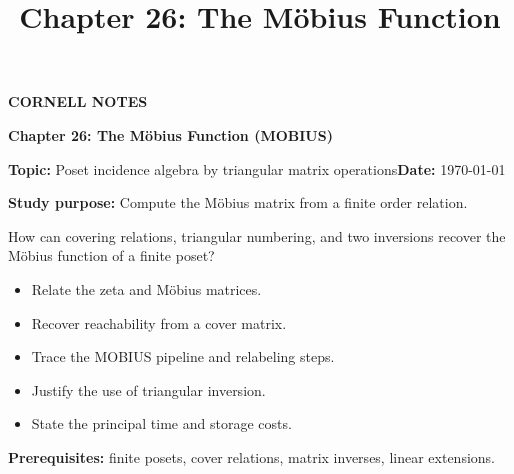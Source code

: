 \documentclass[10pt,letterpaper]{article}
\title{Chapter 26: The M\"obius Function}
\author{}
\date{}
\begin{document}
\maketitle
\begin{tcolorbox}[colback=Paper,colframe=Ink]{\small\bfseries\color{Teal}CORNELL NOTES}\par{\LARGE\bfseries Chapter 26: The M\"obius Function (MOBIUS)}\par\medskip\textbf{Topic:} Poset incidence algebra by triangular matrix operations\hfill\textbf{Date:} \today\par\textbf{Study purpose:} Compute the M\"obius matrix from a finite order relation.
\end{tcolorbox}
\begin{tcolorbox}[colback=Teal!5,colframe=Teal,title=Essential question]How can covering relations, triangular numbering, and two inversions recover the M\"obius function of a finite poset?\end{tcolorbox}
\begin{tcolorbox}[colback=white,colframe=Mist,title=Learning objectives]\begin{itemize}\item Relate the zeta and M\"obius matrices.\item Recover reachability from a cover matrix.\item Trace the MOBIUS pipeline and relabeling steps.\item Justify the use of triangular inversion.\item State the principal time and storage costs.\end{itemize}\textbf{Prerequisites:} finite posets, cover relations, matrix inverses, linear extensions.\end{tcolorbox}
\end{document}
